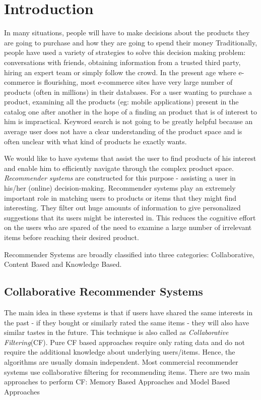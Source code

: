 
\chapter{Introduction}
\label{chap:intro}
In many situations, people will have to make decisions about the products they are going to purchase and how they are going to spend their money 
Traditionally, people have used a variety of strategies to solve this decision making problem: conversations with friends, obtaining information from a trusted third party, hiring an expert team or simply follow the crowd. 
In the present age where e-commerce is flourishing, most e-commerce sites have very large number of products (often in millions) in their databases.
For a user wanting to purchase a product, examining all the products (eg: mobile applications) present in the catalog one after another in the hope of a finding an product that is of interest to him is impractical.
Keyword search is not going to be greatly helpful because an average user does not have a clear understanding of the product space and is often unclear with what kind of products he exactly wants.

We would like to have systems that assist the user to find products of his interest and enable him to efficiently navigate through the complex product space.
\textit{Recommender systems} are constructed for this purpose - assisting a user in his/her (online) decision-making.
Recommender systems play an extremely important role in matching users to products or items that they might find interesting. 
They filter out huge amounts of information to give personalized suggestions that its users might be interested in. 
This reduces the cognitive effort on the users who are spared of the need to examine a large number of irrelevant items before reaching their desired product.

Recommender Systems are broadly classified into three categories: Collaborative, Content Based and Knowledge Based.

\section{Collaborative Recommender Systems}
\label{sec:CF}
 The main idea in these systems is that if users have shared the same interests in the past - if they bought or similarly rated the same items - they will also have similar tastes in the future. 
This technique is also called as \textit{Collaborative Filtering}(CF). 
Pure CF based approaches require only rating data and do not require the additional knowledge about underlying users/items. 
Hence, the algorithms are usually domain independent. Most commercial recommender systems use collaborative filtering for recommending items.
There are two main approaches to perform CF: Memory Based Approaches and Model Based Approaches

